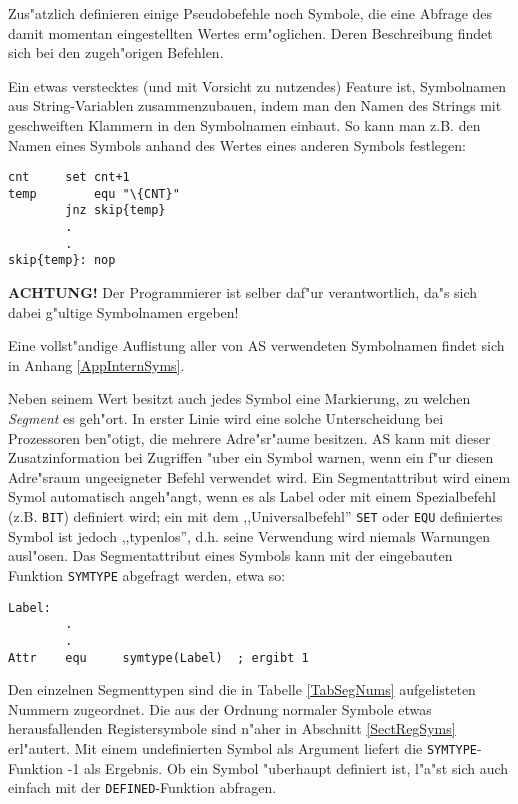 \documentclass[12pt,a4paper,twoside]{report}
\newcommand{\bb}[1]{{\bf #1}}
\newcommand{\tty}[1]{{\tt #1}}
\begin{document}
Zus"atzlich definieren einige Pseudobefehle noch Symbole, die eine
Abfrage des damit momentan eingestellten Wertes erm"oglichen.  Deren
Beschreibung findet sich bei den zugeh"origen Befehlen.
\par
Ein etwas verstecktes (und mit Vorsicht zu nutzendes) Feature ist,
Symbolnamen aus String-Variablen zusammenzubauen, indem man den
Namen des Strings mit geschweiften Klammern in den Symbolnamen
einbaut.  So kann man z.B. den Namen eines Symbols anhand des
Wertes eines anderen Symbols festlegen:
\begin{verbatim}
cnt		set	cnt+1
temp		equ	"\{CNT}"
		jnz	skip{temp}
		.
		.
skip{temp}:	nop
\end{verbatim}
\bb{ACHTUNG!}  Der Programmierer ist selber daf"ur verantwortlich,
da"s sich dabei g"ultige Symbolnamen ergeben!
\par
Eine vollst"andige Auflistung aller von AS verwendeten Symbolnamen
findet sich in Anhang \ref{AppInternSyms}.
\par
Neben seinem Wert besitzt auch jedes Symbol eine Markierung, zu welchen
{\em Segment} es geh"ort.  In erster Linie wird eine solche Unterscheidung
bei Prozessoren ben"otigt, die mehrere Adre"sr"aume besitzen.  AS kann mit
dieser Zusatzinformation bei Zugriffen "uber ein Symbol warnen, wenn ein
f"ur diesen Adre"sraum ungeeigneter Befehl verwendet wird.  Ein
Segmentattribut wird einem Symol automatisch angeh"angt, wenn es als Label
oder mit einem Spezialbefehl (z.B. \tty{BIT}) definiert wird; ein mit
dem ,,Universalbefehl'' \tty{SET} oder \tty{EQU} definiertes Symbol ist
jedoch ,,typenlos'', d.h. seine Verwendung wird niemals Warnungen
ausl"osen.  Das Segmentattribut eines Symbols kann mit der eingebauten
Funktion \tty{SYMTYPE} abgefragt werden, etwa so:
\begin{verbatim}
Label:
        .
        .
Attr    equ     symtype(Label)  ; ergibt 1
\end{verbatim}
Den einzelnen Segmenttypen sind die in Tabelle \ref{TabSegNums}
aufgelisteten Nummern zugeordnet.  Die aus der Ordnung normaler Symbole
etwas herausfallenden Registersymbole sind n"aher in Abschnitt
\ref{SectRegSyms} erl"autert.  Mit einem undefinierten Symbol als Argument
liefert die \tty{SYMTYPE}-Funktion -1 als Ergebnis.  Ob ein Symbol "uberhaupt
definiert ist, l"a"st sich auch einfach mit der \tty{DEFINED}-Funktion abfragen.
\end{document}
